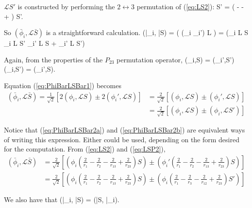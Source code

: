 \documentclass[Dissertation.tex]{subfiles}
\begin{document}
$\mathcal{L}S'$ is constructed by performing the $2 \leftrightarrow 3$ permutation of (\ref{eq:LS2}):
\beq
\label{eq:LSP2}
S' = \left(  -  -  +  \right) S'.
\eeq

So $(\bar{\phi}_i, \mathcal{L}\bar{S})$ is a straightforward calculation.
\beq
\label{eq:PhiBarLSBar1}
(\bar{\phi}_i, \bar{S}) = \left( (\phi_i \pm \phi_i') L \right)
=  \left(\phi_i L S \pm \phi_i L S' \pm \phi_i' L S + \phi_i' L S'\right)
\eeq

Again, from the properties of the $P_{23}$ permutation operator,
\beq
(\phi_i,S) = (\phi_i',S')  (\phi_i,S') = (\phi_i',S).
\eeq

Equation (\ref{eq:PhiBarLSBar1}) becomes
\begin{subequations}
\label{eq:PhiBarLSBar2}
\begin{align}
(\bar{\phi}_i, \mathcal{L}\bar{S}) = \frac{1}{\sqrt{2}} \left[2(\phi_i,\mathcal{L}S) \pm 2(\phi_i',\mathcal{L}S)\right] &= \frac{2}{\sqrt{2}} \left[(\phi_i,\mathcal{L}S) \pm (\phi_i',\mathcal{L}S)\right] \label{eq:PhiBarLSBar2a} \\
 &= \frac{2}{\sqrt{2}} \left[(\phi_i,\mathcal{L}S) \pm (\phi_i,\mathcal{L}S')\right]  \label{eq:PhiBarLSBar2b}
\end{align}
\end{subequations}

Notice that (\ref{eq:PhiBarLSBar2a}) and (\ref{eq:PhiBarLSBar2b}) are equivalent ways of writing this expression.  Either could be used, depending on the form desired for the computation.
From (\ref{eq:LS2}) and (\ref{eq:LSP2}),
\begin{align}
(\bar{\phi}_i, \mathcal{L}\bar{S}) &= \frac{2}{\sqrt{2}} \left[\left( \phi_i \left( \frac{2}{r_1} - \frac{2}{r_2} - \frac{2}{r_{13}} + \frac{2}{r_{23}} \right) S\right) \pm \left( \phi_i' \left( \frac{2}{r_1} - \frac{2}{r_2} - \frac{2}{r_{13}} + \frac{2}{r_{23}} \right) S\right)\right] \\
 &= \frac{2}{\sqrt{2}} \left[\left( \phi_i \left( \frac{2}{r_1} - \frac{2}{r_2} - \frac{2}{r_{13}} + \frac{2}{r_{23}} \right) S\right) \pm \left( \phi_i \left( \frac{2}{r_1} - \frac{2}{r_3} - \frac{2}{r_{12}} + \frac{2}{r_{23}} \right) S'\right)\right]
\end{align}

\noindent We also have that
\beq
(\bar{\phi}_i, \bar{S}) = (\bar{S}, \bar{\phi}_i).
\label{eq:PhiLSPerm}
\eeq
\end{document}
